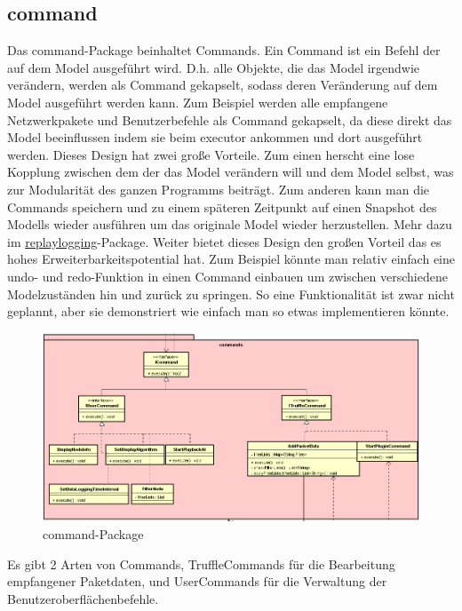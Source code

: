 \subsection{command}
\label{subsec:command}
Das command-Package beinhaltet Commands. Ein Command ist ein Befehl der auf
dem Model ausgeführt wird. D.h. alle Objekte, die das Model irgendwie verändern,
werden als Command gekapselt, sodass deren Veränderung auf dem Model
ausgeführt werden kann. Zum Beispiel werden alle empfangene Netzwerkpakete 
und Benutzerbefehle als Command gekapselt, da diese direkt das Model beeinflussen
indem sie beim \gls{executor} ankommen und dort ausgeführt werden.
\newline
\newline
Dieses Design hat zwei große Vorteile. Zum einen herscht eine lose Kopplung zwischen
dem der das Model verändern will und dem Model selbst, was zur Modularität des ganzen
Programms beiträgt. Zum anderen kann man die Commands speichern und zu einem
späteren Zeitpunkt auf einen Snapshot des Modells wieder ausführen um das originale
Model wieder herzustellen. Mehr dazu im
\hyperref[subsubsec:replaylogging]{replaylogging}-Package. Weiter bietet dieses
Design den großen Vorteil das es hohes Erweiterbarkeitspotential hat. Zum Beispiel
könnte man relativ einfach eine undo- und redo-Funktion in einen Command einbauen um
zwischen verschiedene Modelzuständen hin und zurück zu springen. So eine
Funktionalität ist zwar nicht geplannt, aber sie demonstriert wie einfach man so
etwas implementieren könnte.
\newline
\newline
\begin{figure}[H]
  \centering
  \includegraphics[width=\textwidth]{../diagramimages/commands.png}
  \caption{command-Package}
\end{figure}

Es gibt 2 Arten von Commands, TruffleCommands für die Bearbeitung empfangener
Paketdaten, und UserCommands für die Verwaltung der Benutzeroberflächenbefehle.

